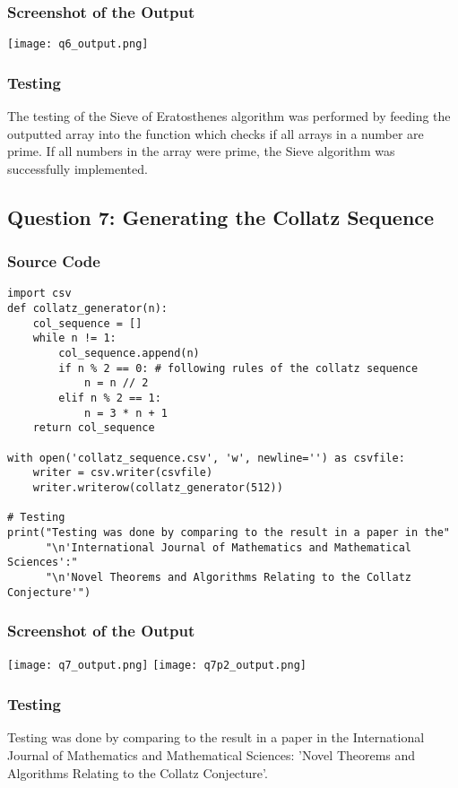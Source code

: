\documentclass{article}
\begin{document}
\subsubsection*{Screenshot of the Output}
\texttt{[image: q6\_output.png]}

\subsubsection*{Testing}
The testing of the Sieve of Eratosthenes algorithm was performed by feeding the outputted array into the function which checks if all arrays in a number are prime. If all numbers in the array were prime, the Sieve algorithm was successfully implemented.

\subsection*{Question 7: Generating the Collatz Sequence}
\subsubsection*{Source Code}
\begin{lstlisting}
import csv
def collatz_generator(n):
    col_sequence = []
    while n != 1:
        col_sequence.append(n)
        if n % 2 == 0: # following rules of the collatz sequence
            n = n // 2
        elif n % 2 == 1:
            n = 3 * n + 1
    return col_sequence

with open('collatz_sequence.csv', 'w', newline='') as csvfile:
    writer = csv.writer(csvfile)
    writer.writerow(collatz_generator(512))

# Testing
print("Testing was done by comparing to the result in a paper in the"
      "\n'International Journal of Mathematics and Mathematical Sciences':"
      "\n'Novel Theorems and Algorithms Relating to the Collatz Conjecture'")
\end{lstlisting}

\subsubsection*{Screenshot of the Output}
\texttt{[image: q7\_output.png]}
\texttt{[image: q7p2\_output.png]}
\subsubsection*{Testing}
Testing was done by comparing to the result in a paper in the International Journal of Mathematics and Mathematical Sciences: 'Novel Theorems and Algorithms Relating to the Collatz Conjecture'. 
\end{document}
